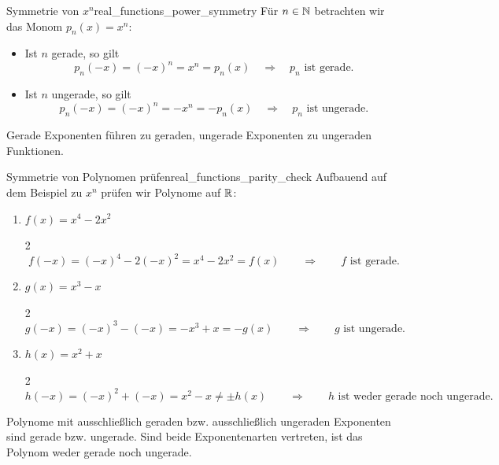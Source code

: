 \begin{ExampleBox}[before skip=0.3\baselineskip]{Symmetrie von $x^n$}{real_functions_power_symmetry}
  Für $n\in\mathbb{N}$ betrachten wir das Monom 
  $p_n(x)=x^n$:
  \begin{itemize}[leftmargin=*,itemsep=0.3em,topsep=0.3em]
    \item Ist $n$ gerade, so gilt
      \[
        p_n(-x)=(-x)^n=x^n=p_n(x)
        \quad\Longrightarrow\quad p_n\text{ ist gerade.}
      \]
    \item Ist $n$ ungerade, so gilt
      \[
        p_n(-x)=(-x)^n=-x^n=-p_n(x)
        \quad\Longrightarrow\quad p_n\text{ ist ungerade.}
      \]
  \end{itemize}
  Gerade Exponenten führen zu geraden, ungerade Exponenten zu ungeraden Funktionen.
\end{ExampleBox}

\begin{ExampleBox}[before skip=0.3\baselineskip]{Symmetrie von Polynomen prüfen}{real_functions_parity_check}
  Aufbauend auf dem Beispiel zu $x^n$ prüfen wir Polynome auf $\mathbb{R}$:
  \begin{enumerate}[label=\alph*),leftmargin=*,itemsep=0.35em,topsep=0.3em]
    \item $f(x)=x^4-2x^2$
      \begin{ClozeArea}[34]{2}
        \[
          f(-x)=(-x)^4-2(-x)^2=x^4-2x^2=f(x)
          \qquad \Longrightarrow \qquad f\text{ ist gerade.}
        \]
      \end{ClozeArea}
    \item $g(x)=x^3-x$
      \begin{ClozeArea}[34]{2}
        \[
          g(-x)=(-x)^3-(-x)=-x^3+x=-g(x)
          \qquad \Longrightarrow \qquad g\text{ ist ungerade.}
        \]
      \end{ClozeArea}
    \item $h(x)=x^2+x$
      \begin{ClozeArea}[34]{2}
        \[
          h(-x)=(-x)^2+(-x)=x^2-x\ne\pm h(x)
          \qquad \Longrightarrow \qquad h\text{ ist weder gerade noch ungerade.}
        \]
      \end{ClozeArea}
  \end{enumerate}
  Polynome mit ausschließlich geraden bzw. ausschließlich ungeraden Exponenten
  sind gerade bzw. ungerade. Sind beide Exponentenarten vertreten, ist das
  Polynom weder gerade noch ungerade.
\end{ExampleBox}

